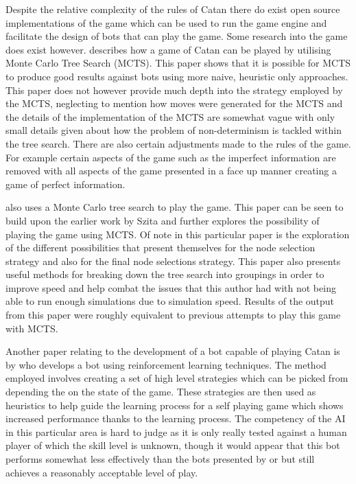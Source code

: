 \documentclass[]{article}
\begin{document}
\par Despite the relative complexity of the rules of Catan there do exist open source implementations of the game which can be used to run the game engine and facilitate the design of bots that can play the game. Some research into the game does exist however. \textcite{szita2009monte} describes how a game of Catan can be played by utilising Monte Carlo Tree Search (MCTS). This paper shows that it is possible for MCTS to produce good results against bots using more naive, heuristic only approaches. This paper does not however provide much depth into the strategy employed by the MCTS, neglecting to mention how moves were generated for the MCTS and the details of the implementation of the MCTS are somewhat vague with only small details given about how the problem of non-determinism is tackled within the tree search. There are also certain adjustments made to the rules of the game. For example certain aspects of the game such as the imperfect information are removed with all aspects of the game presented in a face up manner creating a game of perfect information.

\par \textcite{roelofs2012monte} also uses a Monte Carlo tree search to play the game. This paper can be seen to build upon the earlier work by Szita and further explores the possibility of playing the game using MCTS. Of note in this particular paper is the exploration of the different possibilities that present themselves for the node selection strategy and also for the final node selections strategy. This paper also presents useful methods for breaking down the tree search into groupings in order to improve speed and help combat the issues that this author had with not being able to run enough simulations due to simulation speed. Results of the output from this paper were roughly equivalent to previous attempts to play this game with MCTS.

\par Another paper relating to the development of a bot capable of playing Catan is by \textcite{pfeiffer2004reinforcement} who develops a bot using reinforcement learning techniques. The method employed involves creating a set of high level strategies which can be picked from depending the on the state of the game. These strategies are then used as heuristics to help guide the learning process for a self playing game which shows increased performance thanks to the learning process. The competency of the AI in this particular area is hard to judge as it is only really tested against a human player of which the skill level is unknown, though it would appear that this bot performs somewhat less effectively than the bots presented by \textcite{szita2009monte} or \textcite{roelofs2012monte} but still achieves a reasonably acceptable level of play.
\end{document}

